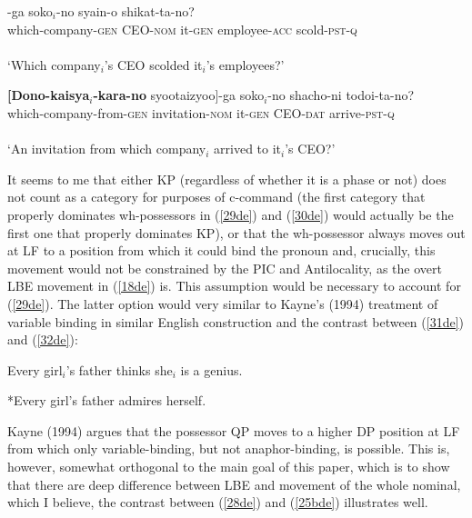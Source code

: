 \documentclass[
    output=paper,
    colorlinks,
    citecolor=brown,
]{langscibook}
\begin{document}
\begin{exe}
\ex \label{29de}
-ga soko$_{i}$-no syain-o shikat-ta-no?\\
which-company-\textsc{gen} CEO-\textsc{nom} it-\textsc{gen} employee-\textsc{acc} scold-\textsc{pst}-\textsc{q}\\\\
‘Which company$_{i}$’s CEO scolded it$_{i}$’s employees?’ 

\ex \label{30de}
\gll \textbf{[Dono-kaisya$_{i}$-kara-no}       syootaizyoo]-ga soko$_{i}$-no shacho-ni todoi-ta-no?\\
which-company-from-\textsc{gen} invitation-\textsc{nom} it-\textsc{gen} CEO-\textsc{dat} arrive-\textsc{pst}-\textsc{q}\\\\
‘An invitation from which company$_{i}$ arrived to it$_{i}$’s CEO?’ 

\end{exe}

It seems to me that either KP (regardless of whether it is a phase or not) does not count as a category for purposes of c-command (the first category that properly dominates wh-possessors in (\ref{29de}) and (\ref{30de}) would actually be the first one that properly dominates KP), or that the wh-possessor always moves out at LF to a position from which it could bind the pronoun and, crucially, this movement would not be constrained by the PIC and Antilocality, as the overt LBE movement in (\ref{18de}) is. This assumption would be necessary to account for (\ref{29de}). The latter option would very similar to Kayne’s (1994) treatment of variable binding in similar English construction and the contrast between (\ref{31de}) and (\ref{32de}):

\begin{exe}
\ex \label{31de}
Every girl$_{i}$’s father thinks she$_{i}$ is a genius.

\ex \label{32de}
*Every girl’s father admires herself.

\end{exe}

Kayne (1994) argues that the possessor QP moves to a higher DP position at LF from which only variable-binding, but not anaphor-binding, is possible. This is, however, somewhat orthogonal to the main goal of this paper, which is to show that there are deep difference between LBE and movement of the whole nominal, which I believe, the contrast between (\ref{28de}) and (\ref{25bde}) illustrates well. 
\end{document}
